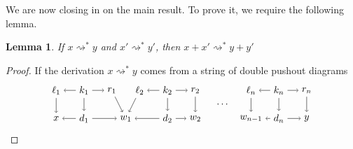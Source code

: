 \documentclass{amsart}
\newcommand{\deriv}[2]{#1 \rightsquigarrow^\ast #2}
\newtheorem{lemma}[theorem]{Lemma}
\theoremstyle{remark}
\theoremstyle{definition}
\begin{document}
We are now closing in on the main result.  To prove it, we
require the following lemma.

\begin{lemma}
\label{thm:rewrite-rel-is-additive}
  If $ \deriv{x}{y} $ and $ \deriv{x'}{y'} $, then $ \deriv{x+x'}{y+y'} $
\end{lemma}

\begin{proof}
  If the derivation $ \deriv{x}{y} $ comes from a string of
  double pushout diagrams
  \[
    \begin{tikzpicture}
      \node (1t) at (0,1) {$ \ell_1 $};
      \node (2t) at (1,1) {$ k_1 $};
      \node (3t) at (2,1) {$ r_1 $};
      \node (4t) at (3,1) {$ \ell_2 $};
      \node (5t) at (4,1) {$ k_2 $};
      \node (6t) at (5,1) {$ r_2 $};
      \node (7t) at (7,1) {$ \ell_n $};
      \node (8t) at (8,1) {$ k_n $};
      \node (9t) at (9,1) {$ r_n $};
      \node (1b) at (0,0) {$ x $};
      \node (2b) at (1,0) {$ d_1 $};
      \node (3b) at (2.5,0) {$ w_1 $};
      \node (4b) at (4,0) {$ d_2 $};
      \node (5b) at (5,0) {$ w_2 $};
      \node (6b) at (7,0) {$ w_{n-1} $};
      \node (7b) at (8,0) {$ d_n $};
      \node (8b) at (9,0) {$ y $};
      \draw [->] (2t) to node [] {\scriptsize{$  $}} (1t);
      \draw [->] (2t) to node [] {\scriptsize{$  $}} (3t);
      \draw [->] (5t) to node [] {\scriptsize{$  $}} (4t);
      \draw [->] (5t) to node [] {\scriptsize{$  $}} (6t);
      \draw [->] (8t) to node [] {\scriptsize{$  $}} (7t);
      \draw [->] (8t) to node [] {\scriptsize{$  $}} (9t);
      \draw [->] (2b) to node [] {\scriptsize{$  $}} (1b);
      \draw [->] (2b) to node [] {\scriptsize{$  $}} (3b);
      \draw [->] (4b) to node [] {\scriptsize{$  $}} (3b);
      \draw [->] (4b) to node [] {\scriptsize{$  $}} (5b);
      \draw [->] (7b) to node [] {\scriptsize{$  $}} (6b);
      \draw [->] (7b) to node [] {\scriptsize{$  $}} (8b);
      \draw [->] (1t) to node [] {\scriptsize{$  $}} (1b);
      \draw [->] (2t) to node [] {\scriptsize{$  $}} (2b);
      \draw [->] (3t) to node [] {\scriptsize{$  $}} (3b);
      \draw [->] (4t) to node [] {\scriptsize{$  $}} (3b);
      \draw [->] (5t) to node [] {\scriptsize{$  $}} (4b);
      \draw [->] (6t) to node [] {\scriptsize{$  $}} (5b);
      \draw [->] (7t) to node [] {\scriptsize{$  $}} (6b);
      \draw [->] (8t) to node [] {\scriptsize{$  $}} (7b);
      \draw [->] (9t) to node [] {\scriptsize{$  $}} (8b);
      \node () at (6,0.5) {$ \dotsm $};
      \begin{scope}[shift={(0,0)}]

\end{scope}
\end{tikzpicture}\]
\end{proof}
\end{document}
